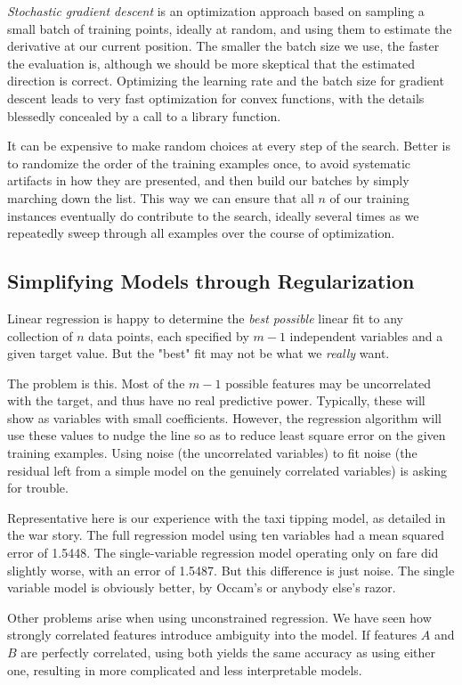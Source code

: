 \documentclass[10pt]{article}
\begin{document}
\textit{Stochastic gradient descent} is an optimization approach based on sampling a small batch of training points, ideally at random, and using them to estimate the derivative at our current position. The smaller the batch size we use, the faster the evaluation is, although we should be more skeptical that the estimated direction is correct. Optimizing the learning rate and the batch size for gradient descent leads to very fast optimization for convex functions, with the details blessedly concealed by a call to a library function.

It can be expensive to make random choices at every step of the search. Better is to randomize the order of the training examples once, to avoid systematic artifacts in how they are presented, and then build our batches by simply marching down the list. This way we can ensure that all $n$ of our training instances eventually do contribute to the search, ideally several times as we repeatedly sweep through all examples over the course of optimization.

\subsection{Simplifying Models through Regularization}
Linear regression is happy to determine the \textit{best possible} linear fit to any collection of $n$ data points, each specified by $m-1$ independent variables and a given target value. But the "best" fit may not be what we \textit{really} want.

The problem is this. Most of the $m-1$ possible features may be uncorrelated with the target, and thus have no real predictive power. Typically, these will show as variables with small coefficients. However, the regression algorithm will use these values to nudge the line so as to reduce least square error on the given training examples. Using noise (the uncorrelated variables) to fit noise (the residual left from a simple model on the genuinely correlated variables) is asking for trouble.

Representative here is our experience with the taxi tipping model, as detailed in the war story. The full regression model using ten variables had a mean squared error of 1.5448. The single-variable regression model operating only on fare did slightly worse, with an error of 1.5487. But this difference is just noise. The single variable model is obviously better, by Occam’s or anybody else’s razor.

Other problems arise when using unconstrained regression. We have seen how strongly correlated features introduce ambiguity into the model. If features $A$ and $B$ are perfectly correlated, using both yields the same accuracy as using either one, resulting in more complicated and less interpretable models.
\end{document}
